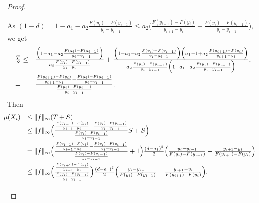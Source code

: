\documentclass[12pt,reqno]{amsart}
\begin{document}
\begin{proof}
\begin{enumerate}
\begin{enumerate}
          As $(1-d)=1-a_1-a_2\frac{F(y_i)-F(y_{i-1})}{y_i-y_{i-1}}\le a_2\Big(\frac{F(y_{i+1})-F(y_{i})}{y_{i+1}-y_{i}}-\frac{F(y_i)-F(y_{i-1})}{y_i-y_{i-1}}\Big),$ we get
\[\begin{array}{ll}
\frac{T}{S}\le&\frac{\Big(1-a_1-a_2\frac{F(y_i)-F(y_{i-1})}{y_i-y_{i-1}}\Big)}{a_2\frac{F(y_i)-F(y_{i-1})}{y_i-y_{i-1}}}
+\frac{\Big(1-a_1-a_2\frac{F(y_i)-F(y_{i-1})}{y_i-y_{i-1}}\Big)\Big(a_1-1+a_2\frac{F(y_{i+1})-F(y_{i})}{y_{i+1}-y_{i}}\Big)}{a_2\frac{F(y_i)-F(y_{i-1})}{y_i-y_{i-1}}\Big(1-a_1-a_2\frac{F(y_i)-F(y_{i-1})}{y_i-y_{i-1}}\Big)},\vspace{3pt}\\
=&\frac{\frac{F(y_{i+1})-F(y_{i})}{y_{i+1}-y_{i}}-\frac{F(y_i)-F(y_{i-1})}{y_i-y_{i-1}}}{\frac{F(y_i)-F(y_{i-1})}{y_i-y_{i-1}}}.

          
          \end{array}\]
   Then 
   \[\hspace{-0.4cm}\begin{array}{ll}
   \mu( X_i)&\le\|f\|_\infty(T+S)\\
   &\le \|f\|_\infty\Big(\frac{\frac{F(y_{i+1})-F(y_{i})}{y_{i+1}-y_{i}}-\frac{F(y_i)-F(y_{i-1})}{y_i-y_{i-1}}}{\frac{F(y_i)-F(y_{i-1})}{y_i-y_{i-1}}}S+S\Big)\vspace{3pt}\\
   &=\|f\|_\infty\Big(\frac{\frac{F(y_{i+1})-F(y_{i})}{y_{i+1}-y_{i}}-\frac{F(y_i)-F(y_{i-1})}{y_i-y_{i-1}}}{\frac{F(y_i)-F(y_{i-1})}{y_i-y_{i-1}}}+1\Big)\frac{(d-a_1)^2}{2}\Big(\frac{y_i-y_{i-1}}{F(y_i)-F(y_{i-1})}-\frac{y_{i+1}-y_i}{F(y_{i+1})-F(y_i)}\Big)\vspace{3pt}\\
   &\le\|f\|_\infty\Big(\frac{\frac{F(y_{i+1})-F(y_{i})}{y_{i+1}-y_{i}}}{\frac{F(y_i)-F(y_{i-1})}{y_i-y_{i-1}}}\Big)\frac{(d-a_1)^2}{2}\Big(\frac{y_i-y_{i-1}}{F(y_i)-F(y_{i-1})}-\frac{y_{i+1}-y_i}{F(y_{i+1})-F(y_i)}\Big).\vspace{3pt}\\


\end{array}\]
\end{enumerate}
\end{enumerate}
\end{proof}
\end{document}
